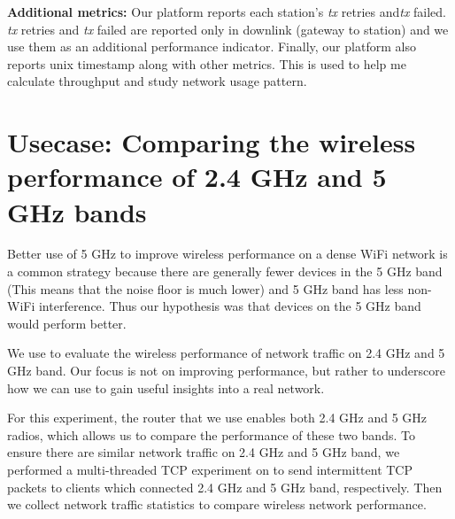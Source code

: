 \textbf{Additional metrics:} Our platform reports each station's \textit{tx} retries and\textit{tx}  failed. \textit{tx}  retries and \textit{tx} failed are reported only in downlink (gateway to station) and we use them as an additional performance indicator. Finally, our platform also reports unix timestamp along with other metrics. This is used to help me calculate throughput and study network usage pattern. 

\section{Usecase: Comparing the wireless performance of 2.4 GHz and 5 GHz bands}
\label{sec.usecase1}

Better use of 5 GHz to improve wireless performance on a dense WiFi network is a common strategy because there are generally fewer devices in the 5 GHz band (This means that the noise floor is much lower) and 5 GHz band has less non-WiFi interference. Thus our hypothesis was that devices on the 5 GHz band would perform better.

We use \sysname to evaluate the wireless performance of network traffic on 2.4 GHz and 5 GHz band. Our focus is not on improving performance, but rather to underscore how we can use \sysname to gain useful insights into a real network.

For this experiment, the router that we use enables both 2.4 GHz and 5 GHz radios, which allows us to compare the performance of these two bands. To ensure there are similar network traffic on 2.4 GHz and 5 GHz band, we performed a multi-threaded TCP experiment on \sysname to send intermittent TCP packets to clients which connected 2.4 GHz and 5 GHz band, respectively. Then we collect network traffic statistics to compare wireless network performance.

